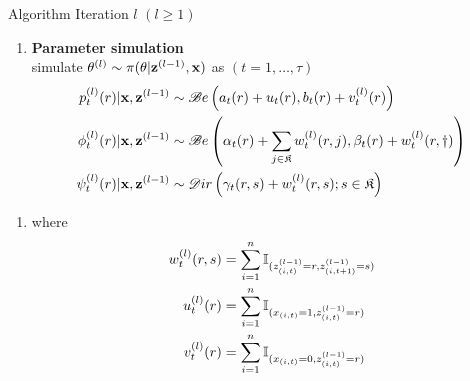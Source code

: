 \begin{slide}
\begin{block}{Algorithm}\small
Iteration $l$ $(l\ge 1)$
\begin{enumerate}
\item {{\bfseries Parameter simulation}}\\
simulate $\theta^{(l)} \sim \pi(\theta|{\bf z}^{(l-1)},\mathbf{x})$ as $(t=1,\ldots,\tau)$
\begin{align*}
p_t^{(l)}(r) | \mathbf{x},{\bf z}^{(l-1)}     & \sim \mathscr{B}e\left(a_t(r)+u_t(r),b_t(r)+ v_t^{(l)}(r)\right)\\
\phi_t^{(l)}(r) | \mathbf{x},{\bf z}^{(l-1)}  & \sim \mathscr{B}e\left(\alpha_t(r)+ \sum_{j \in \mathfrak{K}} w_t^{(l)}(r,j),
                                                            \beta_t(r)+ w_t^{(l)}(r,\dag)\right)\\
\psi_t^{(l)}(r)| \mathbf{x},{\bf z}^{(l-1)}   & \sim \mathscr{D}ir\left(\gamma_t(r,s)+w_t^{(l)}(r,s);s\in \mathfrak{K}\right)
\end{align*}
\end{enumerate}
\normalsize\end{block}

\end{slide}\begin{slide}

\begin{block}\small
\begin{enumerate}
\item[ ]where
\begin{align*}
w_t^{(l)}(r,s) &=\sum_{i=1}^n \mathbb{I}_{(z_{(i,t)}^{(l-1)}=r,z_{(i,t+1)}^{(l-1)}=s)} \\
u^{(l)}_t(r)   &=\sum_{i=1}^n \mathbb{I}_{(x_{(i,t)}=1,z_{(i,t)}^{(l-1)}=r)} \\
v_t^{(l)}(r)   &=\sum_{i=1}^n \mathbb{I}_{(x_{(i,t)}=0,z_{(i,t)}^{(l-1)}=r)}
\end{align*}
\end{enumerate}
\normalsize\end{block}

\end{slide}\begin{slide}


\end{slide}

